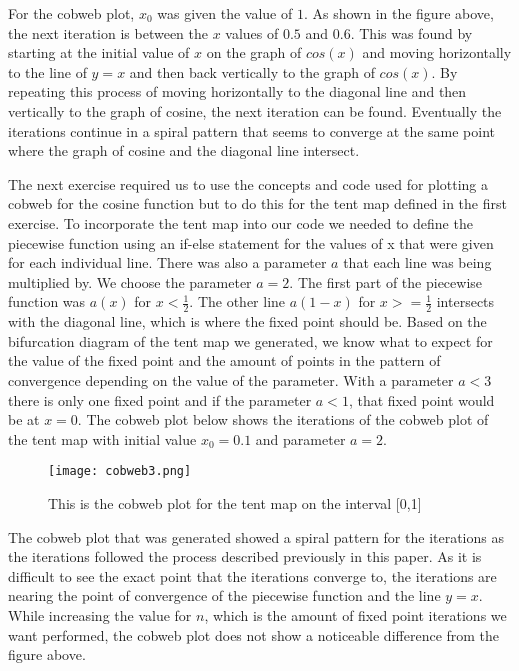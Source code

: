 \documentclass{article}
\begin{document}
For the cobweb plot, $x_0$ was given the value of $1$. As shown in the figure above, the next iteration is between the $x$ values of $0.5$ and $0.6$. This was found by starting at the initial value of $x$ on the graph of $cos(x)$ and moving horizontally to the line of $y=x$ and then back vertically to the graph of $cos(x)$. By repeating this process of moving horizontally to the diagonal line and then vertically to the graph of cosine, the next iteration can be found. Eventually the iterations continue in a spiral pattern that seems to converge at the same point where the graph of cosine and the diagonal line intersect. 

The next exercise required us to use the concepts and code used for plotting a cobweb for the cosine function but to do this for the tent map defined in the first exercise. To incorporate the tent map into our code we needed to define the piecewise function using an if-else statement for the values of x that were given for each individual line. There was also a parameter $a$ that each line was being multiplied by. We choose the parameter $a=2$. The first part of the piecewise function was $a(x)$ for $x<\frac{1}{2}$. The other line $a(1-x)$ for $x>=\frac{1}{2}$ intersects with the diagonal line, which is where the fixed point should be. Based on the bifurcation diagram of the tent map we generated, we know what to expect for the value of the fixed point and the amount of points in the pattern of convergence depending on the value of the parameter. With a parameter $a<3$ there is only one fixed point and if the parameter $a<1$, that fixed point would be at $x=0$. The cobweb plot below shows the iterations of the cobweb plot of the tent map with initial value $x_0= 0.1$ and parameter $a=2$. 


\begin{figure}[htp]
    \centering
    \texttt{[image: cobweb3.png]}
    \caption{This is the cobweb plot for the tent map on the interval [0,1]}
    \label{fig:Cobweb plot}
\end{figure}

The cobweb plot that was generated showed a spiral pattern for the iterations as the iterations followed the process described previously in this paper. As it is difficult to see the exact point that the iterations converge to, the iterations are nearing the point of convergence of the piecewise function and the line $y=x$. While increasing the value for $n$, which is the amount of fixed point iterations we want performed, the cobweb plot does not show a noticeable difference from the figure above.  
\end{document}
